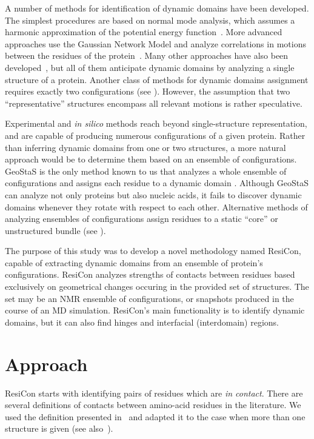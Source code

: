 \documentclass[a4paper,11pt,twoside]{book}%
\begin{document}
A number of methods for identification of dynamic domains have been developed.
The simplest procedures are based on normal mode analysis, which assumes a harmonic approximation of the potential energy function~\cite{hinsen1998analysis}.
More advanced approaches use the Gaussian Network Model and analyze correlations in motions between the residues of the protein~\cite{yesylevskyy2006dynamic}.
Many other approaches have also been developed~\cite{bahar1997direct,wriggers1997protein,bernhard2010optimal,genoni2012identification,potestio2009coarse}, but all of them anticipate dynamic domains by analyzing a single structure of a protein.
Another class of methods for dynamic domains assignment requires exactly two configurations (see \cite{hayward1998systematic,lee2003dyndom,ye2003flexible}).
However, the assumption that two ``representative'' structures encompass all relevant motions is rather speculative.

Experimental and \emph{in silico} methods reach beyond single-structure representation, and are capable of producing numerous configurations of a given protein.
Rather than inferring dynamic domains from one or two structures, a more natural approach would be to determine them based on an ensemble of configurations.
GeoStaS is the only method known to us that analyzes a whole ensemble of configurations and assigns each residue to a dynamic domain \cite{romanowska2012determining}.
Although GeoStaS can analyze not only proteins but also nucleic acids, it fails to discover dynamic domains whenever they rotate with respect to each other.
Alternative methods of analyzing ensembles of configurations assign residues to a static ``core'' or unstructured bundle (see \cite{snyder2005clustering,kirchner2011objective}).

The purpose of this study was to develop a novel methodology named ResiCon, capable of extracting dynamic domains from an ensemble of protein's configurations.
ResiCon analyzes strengths of contacts between residues based exclusively on geometrical changes occuring in the provided set of structures.
The set may be an NMR ensemble of configurations, or snapshots produced in the course of an MD simulation.
ResiCon's main functionality is to identify dynamic domains, but it can also find hinges and interfacial (interdomain) regions.

\section{Approach} 
ResiCon starts with identifying pairs of residues which are \emph{in contact}.
There are several definitions of contacts between amino-acid residues in the literature.
We used the definition presented in~\cite{daniluk2011novel} and adapted it to the case when more than one structure is given (see also~\cite{daniluk2014theoretical}).
\end{document}
